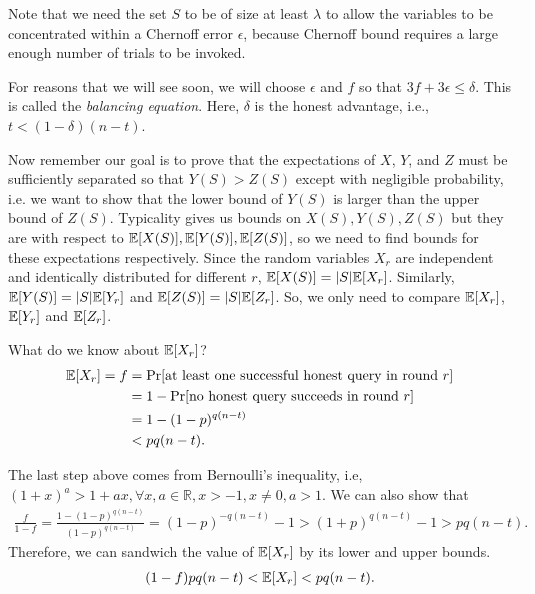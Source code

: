 Note that we need the set $S$ to be of size at least $\lambda$ to allow the variables to be concentrated within a Chernoff error $\epsilon$, because Chernoff bound requires a large enough number of trials to be invoked.

For reasons that we will see soon, we will choose $\epsilon$ and $f$ so that $3f + 3\epsilon \leq \delta$. This is called the \emph{balancing equation}. Here, $\delta$ is the honest advantage, i.e., $t < (1-\delta)(n-t)$.

Now remember our goal is to prove that the expectations of $X$, $Y$, and $Z$ must be sufficiently separated so that $Y(S) > Z(S)$ except with negligible probability, i.e. we want to show that the lower bound of $Y(S)$ is larger than the upper bound of $Z(S)$. Typicality gives us bounds on $X(S), Y(S), Z(S)$ but they are with respect to $\mathbb{E}[X(S)], \mathbb{E}[Y(S)], \mathbb{E}[Z(S)]$, so we need to find bounds for these expectations respectively.
Since the random variables $X_r$ are independent and identically distributed for different $r$, $\mathbb{E}[X(S)] = |S|\mathbb{E}[X_r]$. Similarly, $\mathbb{E}[Y(S)] = |S|\mathbb{E}[Y_r]$ and $\mathbb{E}[Z(S)] = |S|\mathbb{E}[Z_r]$. So, we only need to compare $\mathbb{E}[X_r]$, $\mathbb{E}[Y_r]$ and $\mathbb{E}[Z_r]$.

What do we know about $\mathbb{E}[X_r]$?
\begin{align}
    \mathbb{E}[X_r] = f &= \Pr [\text{at least one successful honest query in round $r$}] \nonumber \\
    & = 1 - \Pr [\text{no honest query succeeds in round $r$}] \nonumber \\
    & = 1 - (1-p)^{q(n-t)} \nonumber \\
    & < pq(n-t).
\end{align}

The last step above comes from Bernoulli's inequality, i.e,  $(1+x)^a > 1+ax, \forall x, a \in \mathbb{R}, x > -1, x \neq 0, a > 1$. We can also show that
\begin{align}
\label{eq.f_lower_bound}
    \frac{f}{1-f} = \frac{1-(1-p)^{q(n-t)}}{(1-p)^{q(n-t)}} = (1-p)^{-q(n-t)} -1 > (1+p)^{q(n-t)} - 1 > pq(n-t).
\end{align}
Therefore, we can sandwich the value of $\mathbb{E}[X_r]$ by its lower and upper bounds.
\begin{align}
    (1-f)pq(n-t) < \mathbb{E}[X_r] < pq(n-t).
\end{align}


